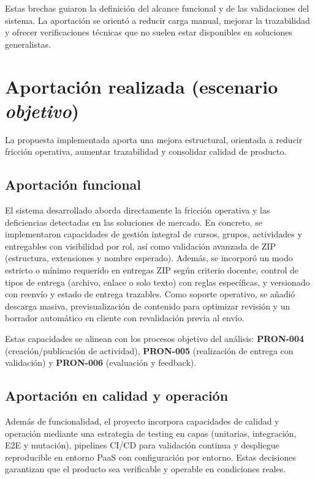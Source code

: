Estas brechas guiaron la definici\'on del alcance funcional y de las
validaciones del sistema. La aportaci\'on se orient\'o a reducir carga
manual, mejorar la trazabilidad y ofrecer verificaciones t\'ecnicas
que no suelen estar disponibles en soluciones generalistas.

\FloatBarrier
\section{Aportaci\'on realizada (escenario \emph{objetivo})}

La propuesta implementada aporta una mejora estructural,
orientada a reducir fricci\'on operativa,
aumentar trazabilidad y consolidar calidad de producto.

\subsection{Aportaci\'on funcional}

El sistema desarrollado aborda directamente la fricci\'on operativa y las deficiencias detectadas en las soluciones de mercado. En concreto, se implementaron capacidades de gesti\'on integral de cursos, grupos, actividades y entregables con visibilidad por rol, as\'i como validaci\'on avanzada de ZIP (estructura, extensiones y nombre esperado). Adem\'as, se incorpor\'o un modo estricto o m\'inimo requerido en entregas ZIP seg\'un criterio docente, control de tipos de entrega (archivo, enlace o solo texto) con reglas espec\'ificas, y versionado con reenv\'io y estado de entrega trazables. Como soporte operativo, se a\~nadi\'o descarga masiva, previsualizaci\'on de contenido para optimizar revisi\'on y un borrador autom\'atico en cliente con revalidaci\'on previa al env\'io.

Estas capacidades se alinean con los procesos objetivo del an\'alisis:
\textbf{PRON-004} (creaci\'on/publicaci\'on de actividad),
\textbf{PRON-005} (realizaci\'on de entrega con validaci\'on)
y \textbf{PRON-006} (evaluaci\'on y feedback).



\subsection{Aportaci\'on en calidad y operaci\'on}

Adem\'as de funcionalidad, el proyecto incorpora capacidades de calidad y operaci\'on mediante una estrategia de testing en capas (unitarias, integraci\'on, E2E y mutaci\'on), pipelines CI/CD para validaci\'on continua y despliegue reproducible en entorno PaaS con configuraci\'on por entorno. Estas decisiones garantizan que el producto sea verificable y operable en condiciones reales.

